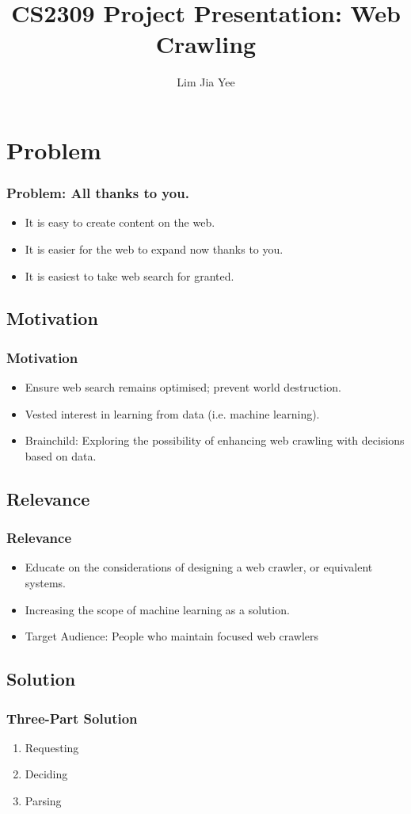 \documentclass{beamer}
\title{CS2309 Project Presentation: Web Crawling}
\author{Lim Jia Yee}
\begin{document}
\frame{\titlepage}

\section{Problem}
\begin{frame}
\frametitle{Problem: All thanks to you.}
\begin{itemize}
\item It is easy to create content on the web.
\item It is easier for the web to expand now thanks to you.
\item It is easiest to take web search for granted.
\end{itemize}
\end{frame}

\subsection{Motivation}
\begin{frame}
\frametitle{Motivation}
\begin{itemize}
\item Ensure web search remains optimised; prevent world destruction.
\item Vested interest in learning from data (i.e. machine learning).
\item Brainchild: Exploring the possibility of enhancing web crawling with decisions based on data.
\end{itemize}
\end{frame}

\subsection{Relevance}
\begin{frame}
\frametitle{Relevance}
\begin{itemize}
\item Educate on the considerations of designing a web crawler, or equivalent systems.
\item Increasing the scope of machine learning as a solution.
\item Target Audience: People who maintain focused web crawlers
\end{itemize}
\end{frame}

\subsection{Solution}
\begin{frame}
\frametitle{Three-Part Solution}
\begin{enumerate}
\item Requesting
\item Deciding
\item Parsing
\end{enumerate}
\end{frame}
\end{document}
